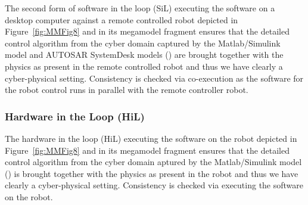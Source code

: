The second form of software in the loop (SiL) executing the software on a desktop computer against a remote controlled robot depicted in Figure~\ref{fig:MMFig8} and in its megamodel fragment ensures that the detailed control algorithm from the cyber domain captured by the Matlab/Simulink model and AUTOSAR SystemDesk models (\CPSLabSystemModels) are brought together with the physics as present in the remote controlled robot and thus we have clearly a cyber-physical setting. Consistency is checked via co-execution as the software for the robot control runs in parallel with the remote controller robot.


\subsubsection{Hardware in the Loop (HiL)}
%
The hardware in the loop (HiL) executing the software on the robot depicted in Figure~\ref{fig:MMFig8} and in its megamodel fragment ensures that the detailed control algorithm from the cyber domain aptured by the Matlab/Simulink model (\CPSLabControlModel) is brought together with the physics as present in the robot and thus we have clearly a cyber-physical setting. Consistency is checked via executing the software on the robot.




